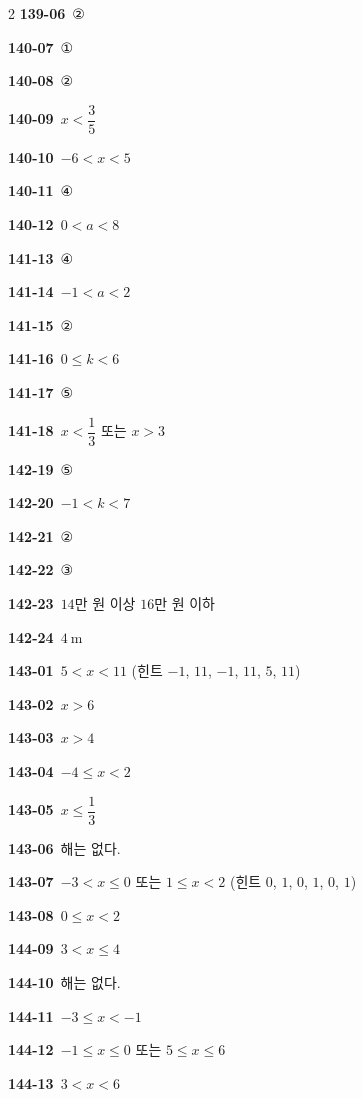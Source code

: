 \documentclass[10pt,a4paper]{article}
\begin{document}
\begin{multicols}{2}
\noindent\textbf{139-06}\ ②\par
\noindent\textbf{140-07}\ ①\par
\noindent\textbf{140-08}\ ②\par
\noindent\textbf{140-09}\ $x<\dfrac{3}{5}$\par
\noindent\textbf{140-10}\ $-6<x<5$\par
\noindent\textbf{140-11}\ ④\par
\noindent\textbf{140-12}\ $0<a<8$\par
\noindent\textbf{141-13}\ ④\par
\noindent\textbf{141-14}\ $-1<a<2$\par
\noindent\textbf{141-15}\ ②\par
\noindent\textbf{141-16}\ $0\le k<6$\par
\noindent\textbf{141-17}\ ⑤\par
\noindent\textbf{141-18}\ $x<\dfrac{1}{3}$ 또는 $x>3$\par
\noindent\textbf{142-19}\ ⑤\par
\noindent\textbf{142-20}\ $-1<k<7$\par
\noindent\textbf{142-21}\ ②\par
\noindent\textbf{142-22}\ ③\par
\noindent\textbf{142-23}\ $14$만 원 이상 $16$만 원 이하\par
\noindent\textbf{142-24}\ $4\ \mathrm{m}$\par
\noindent\textbf{143-01}\ $5<x<11$ (힌트 $-1$, $11$, $-1$, $11$, $5$, $11$)\par
\noindent\textbf{143-02}\ $x>6$\par
\noindent\textbf{143-03}\ $x>4$\par
\noindent\textbf{143-04}\ $-4\le x<2$\par
\noindent\textbf{143-05}\ $x\le \dfrac{1}{3}$\par
\noindent\textbf{143-06}\ 해는 없다.\par
\noindent\textbf{143-07}\ $-3<x\le 0$ 또는 $1\le x<2$ (힌트 $0$, $1$, $0$, $1$, $0$, $1$)\par
\noindent\textbf{143-08}\ $0\le x<2$\par
\noindent\textbf{144-09}\ $3<x\le 4$\par
\noindent\textbf{144-10}\ 해는 없다.\par
\noindent\textbf{144-11}\ $-3\le x<-1$\par
\noindent\textbf{144-12}\ $-1\le x\le 0$ 또는 $5\le x\le 6$\par
\noindent\textbf{144-13}\ $3<x<6$\par

\end{multicols}
\end{document}
